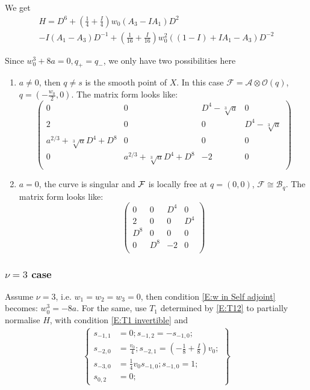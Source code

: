 \documentclass[11pt]{article}
\theoremstyle{definition}
\theoremstyle{plain}
\numberwithin{equation}{section}
\newcommand{\cf}{{{\cal F}}}
\begin{document}
We get
\begin{multline*}
	H=D^6+(\frac{1}{4}+\frac{I}{4})w_0 (A_3-I A_1)D^2
	\\-I(A_1-A_3)D^{-1}+(\frac{1}{16}+\frac{I}{16}) w_0^2 ((1-I)+I A_1-A_3)D^{-2}
\end{multline*}

Since $w_0^3+8a=0, q_{+}=q_-$, we only have two possibilities here
\begin{enumerate}
	\item $a\neq 0$, then $q\neq s$ is the smooth point of $X$. In this case $\mathcal{F}=\mathcal{A}\otimes \mathcal{O}(q)$, $q=(-\frac{w_0}{2},0)$. The matrix form looks like:
	$$
	\left(
	\begin{array}{cccc}
		0 & 0 & D^4-\sqrt[3]{a} & 0 \\
		2 & 0 & 0 & D^4-\sqrt[3]{a} \\
		a^{2/3}+\sqrt[3]{a} D^4+D^8 & 0 & 0 & 0 \\
		0 & a^{2/3}+\sqrt[3]{a} D^4+D^8 & -2 & 0 \\
	\end{array}
	\right)
	$$
	\item $a=0$, the curve is singular and $\cf$ is locally free at $q=(0,0)$, $\mathcal{F}\cong \mathcal{B}_q$. The matrix form looks like:
	$$
	\left(
	\begin{array}{cccc}
		0 & 0 & D^4 & 0 \\
		2 & 0 & 0 & D^4 \\
		D^8 & 0 & 0 & 0 \\
		0 & D^8 & -2 & 0 \\
	\end{array}
	\right)
	$$
	
\end{enumerate}


\subsubsection{$\nu =  3$ case}
\label{S:nu3}

Assume $\nu =3$, i.e. $w_1=w_2=w_3=0$, then  condition \eqref{E:w in Self adjoint} becomes: $w_0^3=-8a$. For the same, use $T_1$ determined by \eqref{E:T12} to partially normalise $H$, with condition \eqref{E:T1 invertible} and 
\begin{align}
	\label{E:Second conjugation self v=3}
	\left\{\begin{aligned}
		s_{-1,1}&=0;s_{-1,2}=-s_{-1,0};
		\\s_{-2,0}&=\frac{v_0}{4};s_{-2,1}=(-\frac{1}{8}+\frac{I}{8}) v_0;
		\\s_{-3,0}&=\frac{1}{4} v_0s_{-1,0}; s_{-1,0}=1;
		\\s_{0,2}&= 0;
		\end{aligned}\right\}
\end{align}
\end{document}
